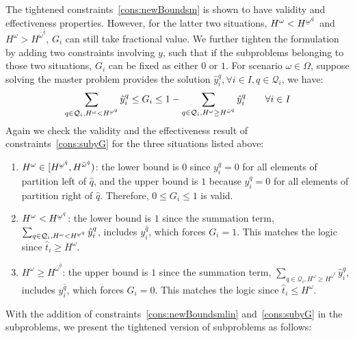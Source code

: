 \documentclass[11pt]{article}
\renewcommand{\underbar}{\underaccent{\bar}}
\begin{document}
	The tightened constraints~\eqref{cons:newBoundsm} is shown to have validity and effectiveness properties. However, for the latter two situations, \(H^\omega < H^{\underbar{\omega}^{\hat{q}}}\) and \(H^\omega > H^{\bar{\omega}^{\hat{q}}}\), \(G_i\) can still take fractional value. We further tighten the formulation by adding two constraints involving \(y\), such that if the subproblems belonging to those two situations, \(G_i\) can be fixed as either \(0\) or \(1\). For scenario \(\omega \in \Omega\), suppose solving the master problem provides the solution \(\hat{y}_i^q, \forall i \in I, q \in \mathcal{Q}_i\), we have:
		\begin{equation}\label{cons:subyG}
			\sum_{q \in \mathcal{Q}_i, H^\omega < H^{\underbar{\omega}^q}} \hat{y}_i^q \leq G_i \leq 1 - \sum_{q \in \mathcal{Q}_i, H^\omega \geq H^{\bar{\omega}^q}} \hat{y}_i^q \qquad \forall i \in I 
		\end{equation}
	Again we check the validity and the effectiveness result of constraints~\eqref{cons:subyG} for the three situations listed above:
	\begin{enumerate}
		\item 
			\(H^\omega \in [H^{\underbar{\omega}^{\hat{q}}},H^{\bar{\omega}^{\hat{q}}})\): the lower bound is \(0\) since \(y_i^q = 0\) for all elements of partition left of \(\hat{q}\), and the upper bound is \(1\) because \(y_i^q = 0\) for all elements of partition right of \(\hat{q}\). Therefore, \(0 \leq G_i \leq 1\) is valid.
		\item 
			\(H^\omega < H^{\underbar{\omega}^{\hat{q}}}\): the lower bound is \(1\) since the summation term, \(\sum_{q \in \mathcal{Q}_i, H^\omega < H^{\underbar{\omega}^q}} \hat{y}_i^q\), includes \(y_i^{\hat{q}}\), which forces \(G_i = 1\). This matches the logic since \(\hat{t}_i \geq H^\omega\).
		\item 
			\(H^\omega \geq H^{\bar{\omega}^{\hat{q}}}\): the upper bound is \(1\) since the summation term, \(\sum_{q \in \mathcal{Q}_i, H^\omega \geq H^{\bar{\omega}^q}} \hat{y}_i^q\), includes \(y_i^{\hat{q}}\), which forces \(G_i = 0\). This matches the logic since \(\hat{t}_i \leq H^\omega\).
	\end{enumerate}
	With the addition of constraints~\eqref{cons:newBoundsmlin} and~\eqref{cons:subyG} in the subproblems, we present the tightened version of subproblems as follows: 
\end{document}
